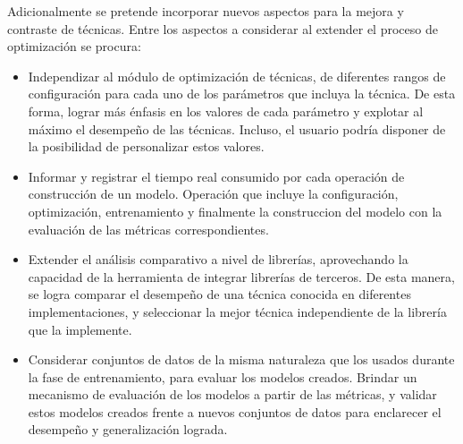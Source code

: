 Adicionalmente se pretende incorporar nuevos aspectos para la mejora
y contraste de técnicas. Entre los aspectos a considerar al extender
el proceso de optimización se procura: 
\begin{itemize}
\item Independizar al módulo de optimización de técnicas, de diferentes
rangos de configuración para cada uno de los parámetros que incluya
la técnica. De esta forma, lograr más énfasis en los valores de cada
parámetro y explotar al máximo el desempeño de las técnicas. Incluso,
el usuario podría disponer de la posibilidad de personalizar estos
valores.
\item Informar y registrar el tiempo real consumido por cada operación de
construcción de un modelo. Operación que incluye la configuración,
optimización, entrenamiento y finalmente la construccion del modelo
con la evaluación de las métricas correspondientes. 
\item Extender el análisis comparativo a nivel de librerías, aprovechando
la capacidad de la herramienta de integrar librerías de terceros.
De esta manera, se logra comparar el desempeño de una técnica conocida
en diferentes implementaciones, y seleccionar la mejor técnica independiente
de la librería que la implemente. 
\item Considerar conjuntos de datos de la misma naturaleza que los usados
durante la fase de entrenamiento, para evaluar los modelos creados.
Brindar un mecanismo de evaluación de los modelos a partir de las
métricas, y validar estos modelos creados frente a nuevos conjuntos
de datos para enclarecer el desempeño y generalización lograda. 
\end{itemize}
%
%

